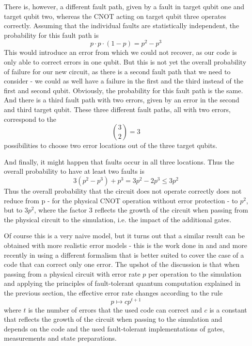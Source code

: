 \documentclass[a4paper, draft]{article}
\theoremstyle{own}
\theoremstyle{remark}
\begin{document}
There is, however, a different fault path, given by a fault in target qubit one and target qubit two, whereas the CNOT acting on target qubit three operates correctly. Assuming that the individual faults are statistically independent, the probability for this fault path is
$$
p \cdot p \cdot (1 - p) = p^2 - p^3 
$$
This would introduce an error from which we could not recover, as our code is only able to correct errors in one qubit. But this is not yet the overall probability of failure for our new circuit, as there is a second fault path that we need to consider - we could as well have a failure in the first and the third instead of the first and second qubit. Obviously, the probability for this fault path is the same. And there is a third fault path with two errors, given by an error in the second and third target qubit. These three different fault paths, all with two errors, correspond to the 
$$
{{3} \choose {2}} = 3
$$
possibilities to choose two error locations out of the three target qubits. 

And finally, it might happen that faults occur in all three locations. Thus the overall probability to have at least two faults is
$$
3 (p^2 - p^3) + p^3 = 3 p^2 - 2 p^3 \leq 3 p^2
$$
Thus the overall probability that the circuit does not operate correctly does not reduce from p - for the physical CNOT operation without error protection - to $p^2$, but to $3 p^2$, where the factor $3$ reflects the growth of the circuit when passing from the physical circuit to the simulation, i.e. the impact of the additional gates.

Of course this is a very naive model, but it turns out that a similar result can be obtained with more realistic error models - this is the work done in  \cite{AharonovOr} and  \cite{KnillLaflammeZurek} and more recently in \cite{AliferisGottesmanPreskill} using a different formalism that is better suited to cover the case of a code that can correct only one error. The upshot of the discussion is that when passing from a physical circuit with error rate $p$ per operation to the simulation and applying the principles of fault-tolerant quantum computation explained in the previous section, the effective error rate changes according to the rule
$$
p \mapsto c p^{t+1}
$$
where $t$ is the number of errors that the used code can correct and $c$ is a constant that reflects the growth of the circuit when passing to the simulation and depends on the code and the used fault-tolerant implementations of gates, measurements and state preparations.
\end{document}
